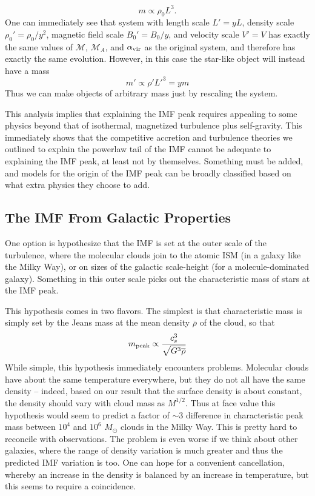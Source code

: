 \begin{equation}
m \propto \rho_0 L^3.
\end{equation}
One can immediately see that system with length scale $L' = y L$, density scale $\rho_0' = \rho_0 / y^2$, magnetic field scale $B_0' = B_0/y$, and velocity scale $V' = V$ has exactly the same values of $\mathcal{M}$, $\mathcal{M}_A$, and $\alpha_{\rm vir}$ as the original system, and therefore has exactly the same evolution. However, in this case the star-like object will instead have a mass
\begin{equation}
m' \propto \rho' L'^3 = y m
\end{equation}
Thus we can make objects of arbitrary mass just by rescaling the system.

This analysis implies that explaining the IMF peak requires appealing to some physics beyond that of isothermal, magnetized turbulence plus self-gravity. This immediately shows that the competitive accretion and turbulence theories we outlined to explain the powerlaw tail of the IMF cannot be adequate to explaining the IMF peak, at least not by themselves. Something must be added, and models for the origin of the IMF peak can be broadly classified based on what extra physics they choose to add.

\subsection{The IMF From Galactic Properties}

One option is hypothesize that the IMF is set at the outer scale of the turbulence, where the molecular clouds join to the atomic ISM (in a galaxy like the Milky Way), or on sizes of the galactic scale-height (for a molecule-dominated galaxy). Something in this outer scale picks out the characteristic mass of stars at the IMF peak.

This hypothesis comes in two flavors. The simplest is that characteristic mass is simply set by the Jeans mass at the mean density $\overline{\rho}$ of the cloud, so that
\begin{equation}
m_{\rm peak} \propto \frac{c_s^3}{\sqrt{G^3 \overline{\rho}}}
\end{equation}
While simple, this hypothesis immediately encounters problems. Molecular clouds have about the same temperature everywhere, but they do not all have the same density -- indeed, based on our result that the surface density is about constant, the density should vary with cloud mass as $M^{1/2}$. Thus at face value this hypothesis would seem to predict a factor of $\sim 3$ difference in characteristic peak mass between $10^4$ and $10^6$ $M_\odot$ clouds in the Milky Way. This is pretty hard to reconcile with observations. The problem is even worse if we think about other galaxies, where the range of density variation is much greater and thus the predicted IMF variation is too. One can hope for a convenient cancellation, whereby an increase in the density is balanced by an increase in temperature, but this seems to require a coincidence.

